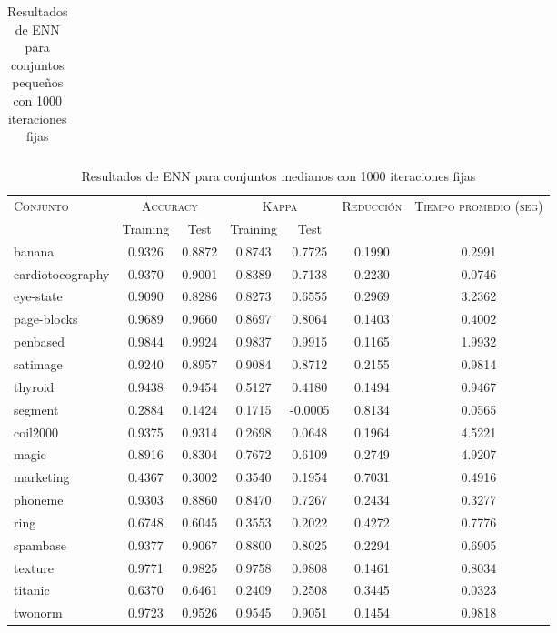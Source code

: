 \begin{table}[]
\begin{tabular}{l c c c c c c}
\hline
\end{tabular}
\caption{Resultados de ENN para conjuntos pequeños con 1000 iteraciones fijas}
\label{res-peq-ENN}
\end{table}

\begin{table}[]
\centering
\begin{tabular}{l c c c c c c}
\hline
\multirow{2}{*}{\textsc{Conjunto}}
	& \multicolumn{2}{c}{\textsc{Accuracy}}
	& \multicolumn{2}{c}{\textsc{Kappa}}
	& \textsc{Reducción}
	& \textsc{Tiempo promedio (seg)} \\
	& Training & Test
	& Training & Test \\ 
\hline
\hline

banana & 0.9326 & 0.8872 & 0.8743 & 0.7725 & 0.1990 & 0.2991 \\
cardiotocography & 0.9370 & 0.9001 & 0.8389 & 0.7138 & 0.2230 & 0.0746 \\
eye-state & 0.9090 & 0.8286 & 0.8273 & 0.6555 & 0.2969 & 3.2362 \\
page-blocks & 0.9689 & 0.9660 & 0.8697 & 0.8064 & 0.1403 & 0.4002 \\
penbased & 0.9844 & 0.9924 & 0.9837 & 0.9915 & 0.1165 & 1.9932 \\
satimage & 0.9240 & 0.8957 & 0.9084 & 0.8712 & 0.2155 & 0.9814 \\
thyroid & 0.9438 & 0.9454 & 0.5127 & 0.4180 & 0.1494 & 0.9467 \\
segment & 0.2884 & 0.1424 & 0.1715 & -0.0005 & 0.8134 & 0.0565 \\
coil2000 & 0.9375 & 0.9314 & 0.2698 & 0.0648 & 0.1964 & 4.5221 \\
magic & 0.8916 & 0.8304 & 0.7672 & 0.6109 & 0.2749 & 4.9207 \\
marketing & 0.4367 & 0.3002 & 0.3540 & 0.1954 & 0.7031 & 0.4916 \\
phoneme & 0.9303 & 0.8860 & 0.8470 & 0.7267 & 0.2434 & 0.3277 \\
ring & 0.6748 & 0.6045 & 0.3553 & 0.2022 & 0.4272 & 0.7776 \\
spambase & 0.9377 & 0.9067 & 0.8800 & 0.8025 & 0.2294 & 0.6905 \\
texture & 0.9771 & 0.9825 & 0.9758 & 0.9808 & 0.1461 & 0.8034 \\
titanic & 0.6370 & 0.6461 & 0.2409 & 0.2508 & 0.3445 & 0.0323 \\
twonorm & 0.9723 & 0.9526 & 0.9545 & 0.9051 & 0.1454 & 0.9818 \\

\hline
\end{tabular}
\caption{Resultados de ENN para conjuntos medianos con 1000 iteraciones fijas}
\label{res-med-ENN}
\end{table}

